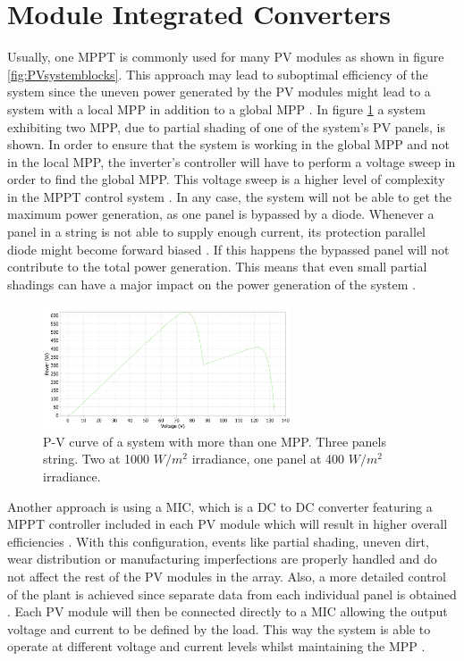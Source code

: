 
\section{Module Integrated Converters}

Usually, one MPPT is commonly used for many PV modules as shown in figure \ref{fig:PVsystemblocks}. This approach may lead to suboptimal efficiency of the system since the uneven power generated by the PV modules might lead to a system with a local MPP in addition to a global MPP \cite{AN1521_MC}. In figure \ref{multiple_local_MPP} a system exhibiting two MPP, due to partial shading of one of the system's PV panels, is shown. In order to ensure that the system is working in the global MPP and not in the local MPP, the inverter's controller will have to perform a voltage sweep in order to find the global MPP. This voltage sweep is a higher level of complexity in the MPPT control system \cite{AN1521_MC}. In any case, the system will not be able to get the maximum power generation, as one panel is bypassed by a diode. Whenever a panel in a string is not able to supply enough current, its protection parallel diode might become  forward biased \cite{ArchitectureMIC}. If this happens the bypassed panel will not contribute to the total power generation. This means that even small partial shadings can have a major impact on the power generation of the system \cite{partial_shading_cons}. 
\begin{figure}[H]
	\begin{center}
		\includegraphics[width=0.65\textwidth]{../Pictures/local_MPP_PLECS.png}
		\caption{P-V curve of a system with more than one MPP. Three panels string. Two at 1000 $W/m^2$ irradiance, one panel at 400 $W/m^2$ irradiance.}
		\label{multiple_local_MPP}
	\end{center}	
\end{figure} 

Another approach is using a MIC, which is a DC to DC converter featuring a MPPT controller included in each PV module which will result in higher overall efficiencies \cite{ArchitectureMIC}. With this configuration, events like partial shading, uneven dirt, wear distribution or manufacturing imperfections are properly handled and do not affect the rest of the PV modules in the array. Also, a more detailed control of the plant is achieved since separate data from each individual panel is obtained \cite{ArchitectureMIC}. Each PV module will then be connected directly to a MIC allowing the output voltage and current to be defined by the load. This way the system is able to operate at different voltage and current levels whilst maintaining the MPP \cite{ArchitectureMIC}.


